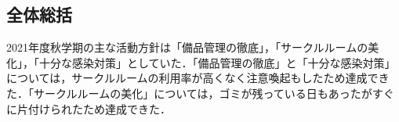 \subsection*{全体総括}

2021年度秋学期の主な活動方針は「備品管理の徹底」，「サークルルームの美化」，「十分な感染対策」としていた．「備品管理の徹底」と「十分な感染対策」については，サークルルームの利用率が高くなく注意喚起もしたため達成できた．「サークルルームの美化」については，ゴミが残っている日もあったがすぐに片付けられたため達成できた．
